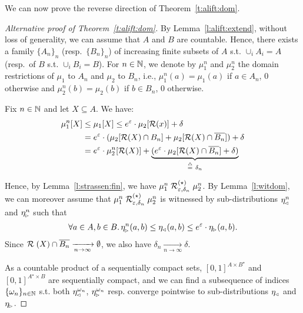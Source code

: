 \documentclass{lmcs}
\begin{document}
We can now prove the reverse direction of Theorem~\ref{t:alift:dom}.

\begin{proof}[Alternative proof of Theorem~\ref{t:alift:dom}]
  By Lemma~\ref{l:alift:extend}, without loss of generality, we can
  assume that $A$ and $B$ are countable. Hence, there exists a family
  $\{ A_n \}_n$ (resp.\ $\{ B_n \}_n$) of increasing finite subsets of
  $A$ s.t. $\cup_i A_i = A$ (resp.\ of $B$ s.t.  $\cup_i B_i = B$). For
  $n \in \mathbb{N}$, we denote by $\mu_1^n$ and $\mu_2^n$ the domain
  restrictions of $\mu_1$ to $A_n$ and $\mu_2$ to $B_n$,
  i.e., $\mu_1^n(a) = \mu_1(a)$ if $a \in A_n$, $0$ otherwise and
  $\mu_2^n(b) = \mu_2(b)$ if $b \in B_n$, $0$ otherwise.

  \medskip

  Fix $n \in \mathbb{N}$ and let $X \subseteq A$. We have:
  \begin{align*}
    \mu_1^n[X]
      &\leq \mu_1[X] \leq e^\epsilon \cdot \mu_2[\oR(x)] + \delta \\
      &= e^\epsilon \cdot (\mu_2[\oR(X) \cap B_n]
           + \mu_2[\oR(X) \cap \rcomp{B_n}]) + \delta \\
      &= e^\epsilon \cdot \mu_2^n[\oR(X)] + \underbrace{
           (e^\epsilon \cdot \mu_2[\oR(X) \cap \rcomp{B_n}] + \delta)%
         }_{\eqdef\ \delta_n}
  \end{align*}

  Hence, by Lemma~\ref{l:strassen:fin}, we have
  $\mu_1^n \mathrel{\mathrel{\mathcal{R}}^{(\star)}_{\varepsilon, \delta_n}} \mu_2^n$. By
  Lemma~\ref{l:witdom}, we can moreover assume that
  $\mu_1^n \mathrel{\mathrel{\mathcal{R}}^{(\star)}_{\varepsilon, \delta_n}} \mu_2^n$ is witnessed by
  sub-distributions $\eta_{\mspace{-1.5mu}{\scriptscriptstyle \vartriangleleft}}^n$ and $\eta_{\mspace{-1.5mu}{\scriptscriptstyle \vartriangleright}}^n$ such that
  \begin{gather}
    \forall a \in A, b \in B .\,
      \eta_{\mspace{-1.5mu}{\scriptscriptstyle \vartriangleright}}^n(a, b) \leq \eta_{\mspace{-1.5mu}{\scriptscriptstyle \vartriangleleft}}(a, b)
        \leq e^\varepsilon \cdot \eta_{\mspace{-1.5mu}{\scriptscriptstyle \vartriangleright}}(a, b) .
    \label{eq:lwitord}
  \end{gather}
  Since $\mathrel{\mathcal{R}}(X) \cap \overline{B_n} \xrightarrow[n \to \infty]{} \emptyset$, we
  also have $\delta_n \xrightarrow[n \to \infty]{} \delta$.

  As a countable product of a sequentially compact sets,
  $[0,1]^{A \times B^\star}$ and $[0,1]^{A^\star \times B}$ are
  sequentially compact, and we can find a subsequence of indices
  $\{ \omega_n \}_{n \in \mathbb{N}}$ s.t. both $\eta_{\mspace{-1.5mu}{\scriptscriptstyle \vartriangleleft}}^{\omega_n}$,
  $\eta_{\mspace{-1.5mu}{\scriptscriptstyle \vartriangleright}}^{\omega_n}$ resp. converge pointwise to
  sub-distributions $\eta_{\mspace{-1.5mu}{\scriptscriptstyle \vartriangleleft}}$ and $\eta_{\mspace{-1.5mu}{\scriptscriptstyle \vartriangleright}}$.
  

\end{proof}
\end{document}
